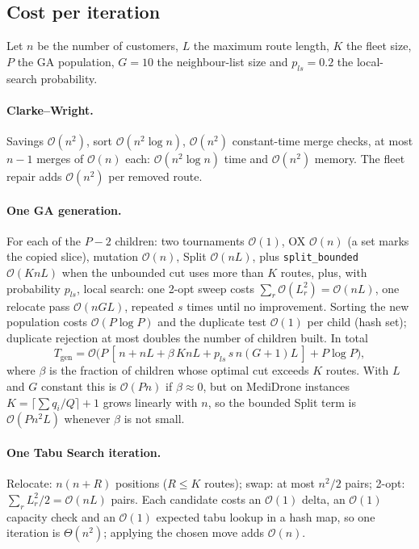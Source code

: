 \documentclass[11pt,a4paper]{article}
\theoremstyle{definition}
\theoremstyle{remark}
\newcommand{\code}[1]{\texttt{#1}}
\newcommand{\Ocal}{\mathcal{O}}
\begin{document}
\subsection{Cost per iteration}
Let $n$ be the number of customers, $L$ the maximum route length, $K$ the fleet size,
$P$ the GA population, $G=10$ the neighbour-list size and $p_{ls}=0.2$ the local-search
probability.

\paragraph{Clarke--Wright.} Savings $\Ocal(n^2)$, sort $\Ocal(n^2\log n)$, $\Ocal(n^2)$
constant-time merge checks, at most $n-1$ merges of $\Ocal(n)$ each:
$\Ocal(n^2\log n)$ time and $\Ocal(n^2)$ memory. The fleet repair adds $\Ocal(n^2)$ per removed
route.

\paragraph{One GA generation.} For each of the $P-2$ children: two tournaments $\Ocal(1)$,
OX $\Ocal(n)$ (a set marks the copied slice), mutation $\Ocal(n)$, Split $\Ocal(nL)$, plus
\code{split\_bounded} $\Ocal(KnL)$ when the unbounded cut uses more than $K$ routes, plus,
with probability $p_{ls}$, local search: one 2-opt sweep costs $\sum_r\Ocal(L_r^2)=\Ocal(nL)$,
one relocate pass $\Ocal(nGL)$, repeated $s$ times until no improvement. Sorting the new
population costs $\Ocal(P\log P)$ and the duplicate test $\Ocal(1)$ per child (hash set);
duplicate rejection at most doubles the number of children built. In total
\[
T_{\text{gen}} = \Ocal\!\big(P\,[\,n + nL + \beta\,KnL + p_{ls}\, s\, n(G+1)L\,] + P\log P\big),
\]
where $\beta$ is the fraction of children whose optimal cut exceeds $K$ routes. With $L$
and $G$ constant this is $\Ocal(Pn)$ if $\beta\approx 0$, but on MediDrone instances
$K=\lceil\sum q_i/Q\rceil+1$ grows linearly with $n$, so the bounded Split term is
$\Ocal(Pn^2L)$ whenever $\beta$ is not small.

\paragraph{One Tabu Search iteration.} Relocate: $n(n+R)$ positions ($R\le K$ routes);
swap: at most $n^2/2$ pairs; 2-opt: $\sum_r L_r^2/2=\Ocal(nL)$ pairs. Each candidate costs an
$\Ocal(1)$ delta, an $\Ocal(1)$ capacity check and an $\Ocal(1)$ expected tabu lookup in a hash
map, so one iteration is $\Theta(n^2)$; applying the chosen move adds $\Ocal(n)$.
\end{document}
